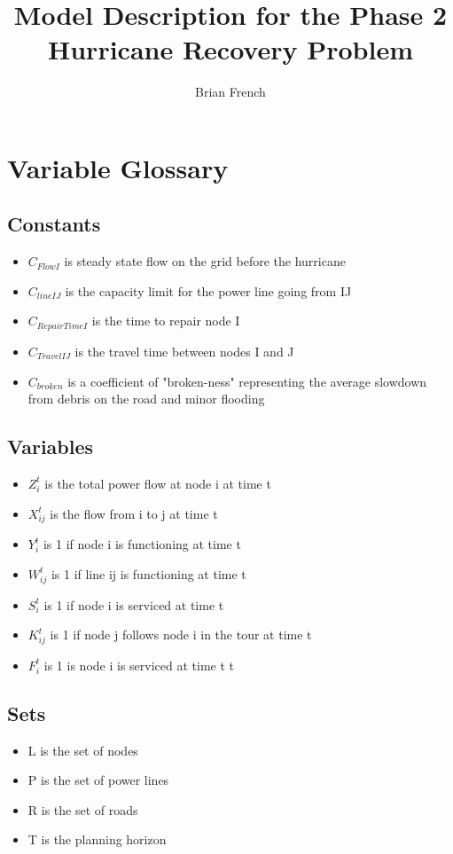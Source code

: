\documentclass{article}
\begin{document}
	\title{Model Description for the Phase 2 Hurricane Recovery Problem}
	\author{Brian French}
	\maketitle
	
	\section{Variable Glossary}
	\subsection{Constants}
	\begin{itemize}
		\item $C_{FlowI}$ is steady state flow on the grid before the hurricane
		\item $C_{lineIJ}$ is the capacity limit for the power line going from IJ
		\item $C_{RepairTimeI}$ is the time to repair node I
		\item $C_{TravelIJ}$ is the travel time between nodes I and J
		\item $C_{broken}$ is a coefficient of "broken-ness" representing the average slowdown from debris on the road and minor flooding
	\end{itemize}
	\subsection{Variables}
	\begin{itemize}
		\item $Z_{i}^{t}$ is the total power flow at node i at time t
		\item $X_{ij}^{t}$ is the flow from i to j at time t
		\item $Y_i^t$ is 1 if node i is functioning at time t
		\item $W_{ij}^t$ is 1 if line ij is functioning at time t
		\item $S_{i}^t$ is 1 if node i is serviced at time t
		\item $K_{ij}^t$ is 1 if node j follows node i in the tour at time t 
		\item $F_i^t$ is 1 is node i is serviced at time t t
	\end{itemize}
\subsection{Sets}
\begin{itemize}
	\item L is the set of nodes
	\item P is the set of power lines
	\item R is the set of roads
	\item T is the planning horizon
\end{itemize}
\end{document}
